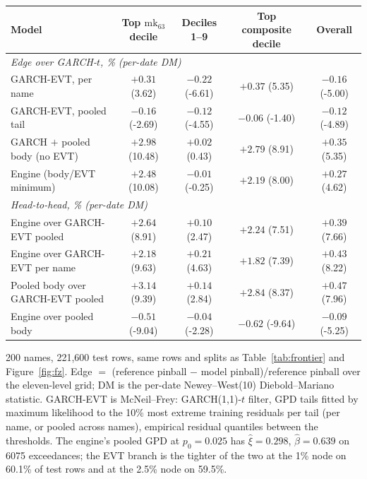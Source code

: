\begin{tabular}{lcccc}
\toprule
Model & Top $\mathrm{mk}_{63}$ decile & Deciles 1--9 & Top composite decile & Overall \\
\midrule
\multicolumn{5}{l}{\emph{Edge over GARCH-$t$, \% (per-date DM)}} \\
GARCH-EVT, per name & $+0.31$ (3.62) & $-0.22$ (-6.61) & $+0.37$ (5.35) & $-0.16$ (-5.00) \\
GARCH-EVT, pooled tail & $-0.16$ (-2.69) & $-0.12$ (-4.55) & $-0.06$ (-1.40) & $-0.12$ (-4.89) \\
GARCH $+$ pooled body (no EVT) & $+2.98$ (10.48) & $+0.02$ (0.43) & $+2.79$ (8.91) & $+0.35$ (5.35) \\
Engine (body/EVT minimum) & $+2.48$ (10.08) & $-0.01$ (-0.25) & $+2.19$ (8.00) & $+0.27$ (4.62) \\
\midrule
\multicolumn{5}{l}{\emph{Head-to-head, \% (per-date DM)}} \\
Engine over GARCH-EVT pooled & $+2.64$ (8.91) & $+0.10$ (2.47) & $+2.24$ (7.51) & $+0.39$ (7.66) \\
Engine over GARCH-EVT per name & $+2.18$ (9.63) & $+0.21$ (4.63) & $+1.82$ (7.39) & $+0.43$ (8.22) \\
Pooled body over GARCH-EVT pooled & $+3.14$ (9.39) & $+0.14$ (2.84) & $+2.84$ (8.37) & $+0.47$ (7.96) \\
Engine over pooled body & $-0.51$ (-9.04) & $-0.04$ (-2.28) & $-0.62$ (-9.64) & $-0.09$ (-5.25) \\
\bottomrule
\end{tabular}
\begin{tablenotes}\footnotesize
\item 200 names, 221,600 test rows, same rows and splits as Table~\ref{tab:frontier} and Figure~\ref{fig:fz}. Edge $=$ (reference pinball $-$ model pinball)/reference pinball over the eleven-level grid; DM is the per-date Newey--West(10) Diebold--Mariano statistic. GARCH-EVT is McNeil--Frey: GARCH(1,1)-$t$ filter, GPD tails fitted by maximum likelihood to the 10\% most extreme training residuals per tail (per name, or pooled across names), empirical residual quantiles between the thresholds. The engine's pooled GPD at $p_0=0.025$ has $\hat\xi=0.298$, $\hat\beta=0.639$ on 6075 exceedances; the EVT branch is the tighter of the two at the 1\% node on 60.1\% of test rows and at the 2.5\% node on 59.5\%.
\end{tablenotes}
